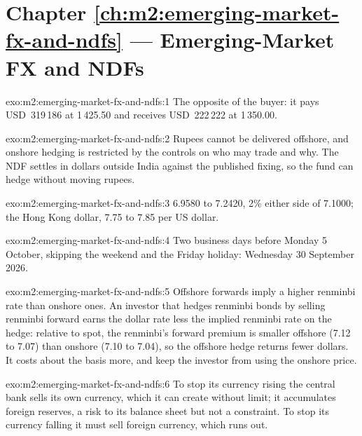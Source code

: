 \section*{Chapter \ref{ch:m2:emerging-market-fx-and-ndfs} --- Emerging-Market FX and NDFs}

\begin{solution}{exo:m2:emerging-market-fx-and-ndfs:1}
The opposite of the buyer: it pays USD~319\,186 at 1\,425.50 and receives
USD~222\,222 at 1\,350.00.
\end{solution}

\begin{solution}{exo:m2:emerging-market-fx-and-ndfs:2}
Rupees cannot be delivered offshore, and onshore hedging is restricted by the
controls on who may trade and why. The NDF settles in dollars outside India
against the published fixing, so the fund can hedge without moving rupees.
\end{solution}

\begin{solution}{exo:m2:emerging-market-fx-and-ndfs:3}
6.9580 to 7.2420, 2\% either side of 7.1000; the Hong Kong dollar, 7.75 to 7.85
per US dollar.
\end{solution}

\begin{solution}{exo:m2:emerging-market-fx-and-ndfs:4}
Two business days before Monday 5 October, skipping the weekend and the Friday
holiday: Wednesday 30 September 2026.
\end{solution}

\begin{solution}{exo:m2:emerging-market-fx-and-ndfs:5}
Offshore forwards imply a higher renminbi rate than onshore ones. An investor
that hedges renminbi bonds by selling renminbi forward earns the dollar rate less
the implied renminbi rate on the hedge: relative to spot, the renminbi's forward
premium is smaller offshore (7.12 to 7.07) than onshore (7.10 to 7.04), so the
offshore hedge returns fewer dollars. It costs about the basis more, and  keep the investor from using the onshore price.
\end{solution}

\begin{solution}{exo:m2:emerging-market-fx-and-ndfs:6}
To stop its currency rising the central bank sells its own currency, which it
can create without limit; it accumulates foreign reserves, a risk to its balance
sheet but not a constraint. To stop its currency falling it must sell foreign
currency, which runs out.
\end{solution}

